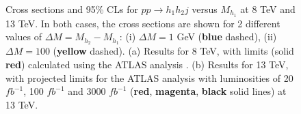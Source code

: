 \documentclass[12pt,a4paper]{article}
\newcommand {\blue} {\color{blue}}
\newcommand {\red} {\color{red}}
\newcommand {\magenta} {\color{Plum}}
\newcommand {\yellow} {\color{NewYellow}}
\begin{document}
\begin{figure}[h!]
\centering
\caption{Cross sections and 95\% CLs for $pp \to h_1 h_2 j$ versus $M_{h_1}$ at 8 TeV and 13 TeV. In both cases, the cross sections are shown for 2 different values of $\Delta M = M_{h_2} - M_{h_1}$: (i) $\Delta M = 1$ GeV ({\bf \blue blue} dashed), (ii) $\Delta M = 100$ ({\bf \yellow yellow} dashed). (a) Results for 8 TeV, with limits (solid {\bf \red red}) calculated using the ATLAS analysis \cite{Aad:2015zva}. (b) Results for 13 TeV, with projected limits for the ATLAS analysis \cite{Aad:2015zva} with luminosities of 20 $fb^{-1}$, 100 $fb^{-1}$ and 3000 $fb^{-1}$ ({\bf \red red}, {\bf \magenta magenta}, {\bf black} solid lines) at 13 TeV.} \label{cc_limit_h1h2}
\end{figure}
\end{document}
